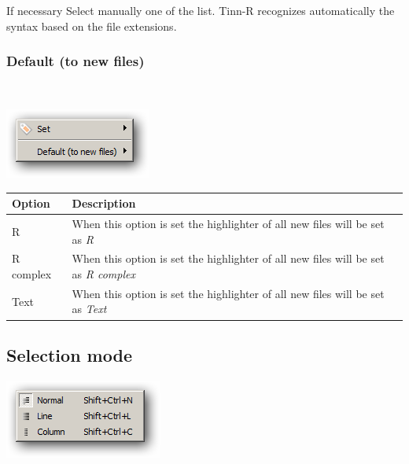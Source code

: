If necessary Select manually one of the list. Tinn-R recognizes
automatically the syntax based on the file extensions.


\hypertarget{menu_options_syntax_default}{}
\subsubsection{Default (to new files)}\\

\includegraphics[scale=0.50]{./res/menu_options_syntax.png}\\

\begin{scriptsize}\begin{tabularx}{\textwidth}{>{\hsize=0.2\hsize}X>{\hsize=0.8\hsize}X}\\
    \hline
    \textbf{Option} & \textbf{Description} \\
    \hline
    R & When this option is set the highlighter of all new files will be set as \textit{R} \\
    R complex & When this option is set the highlighter of all new files will be set as \textit{R complex} \\
    Text & When this option is set the highlighter of all new files will be set as \textit{Text} \\
    \hline
  \end{tabularx}\end{scriptsize}


\hypertarget{menu_options_selectionmode}{}
\subsection{Selection mode}

\includegraphics[scale=0.50]{./res/menu_options_selectionmode.png}\\

